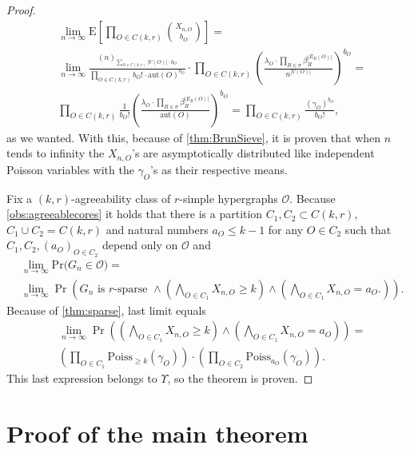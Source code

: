 \documentclass[12pt,notitlepage,a4paper]{article}
\theoremstyle{definition}
\newcommand{\Ln}{\lim\limits_{n\to \infty}}
\newcommand{\PR}[1]{\mathrm{Pr}\big(#1\big)}
\newcommand{\aut}{\mathrm{aut}}
\begin{document}
\begin{proof}
\begin{align*}
&\Ln \mathrm{E}\left[
\prod_{O\in C(k,r)}
\binom{X_{n,O}}{b_O}
\right]=\\
&
\Ln
\frac{(n)_{\sum_{O\in C(k,r)} |V(O)|\cdot b_O}}
{\prod_{O\in C(k,r)} b_O!\cdot \aut(O)^{b_O}} \cdot
\prod_{O\in C(k,r)}
\left( 
\frac{\lambda_O \cdot \prod_{R\in \sigma} \beta_R^{|E_R(O)|}}{n^{|V(O)|}}
\right)^{b_O} = \\
&\prod_{O\in C(k,r)} \frac{1}{b_O!}\left(\frac{\lambda_O  
\cdot \prod_{R\in \sigma} \beta_R^{|E_R(O)|} }{\aut(O)}
\right)^{b_O}= \prod_{O\in C(k,r)} 
\frac{(\gamma_O)^{b_O}}{b_O!},
\end{align*}
as we wanted. With this, because of \cref{thm:BrunSieve}, it 
is proven that when $n$ tends to infinity
the $X_{n,O}$'s are asymptotically distributed 
like independent
Poisson variables with the $\gamma_O$'s as their respective means.\par
Fix a $(k,r)$-agreeability class of $r$-simple hypergraphs
$\mathcal{O}$. 
Because \cref{obs:agreeablecores} it holds that
there is a partition $C_1, C_2\subset C(k,r)$, $C_1\cup C_2=C(k,r)$ 
and natural numbers $a_O\leq k-1$ for any $O\in C_2$ such that
$C_1, C_2, (a_O)_{O\in C_2}$ depend only on $\mathcal{O}$ and
\begin{align*}
 & \Ln
 \PR{G_n \in \mathcal{O}}=\\
 &\Ln
 \Pr \left(
 G_n \text{ is $r$-sparse } \wedge
 \left(
 \bigwedge_{O\in C_1}
 X_{n,O}\geq k
 \right)
 \wedge
 \left(
 \bigwedge_{O\in C_1}
 X_{n,O}=a_O.
 \right)
 \right).
\end{align*}
Because of \cref{thm:sparse}, last limit equals
\begin{align*}
&\Ln
\Pr \left(
\left(
\bigwedge_{O\in C_1}
X_{n,O}\geq k
\right)
\wedge
\left(
\bigwedge_{O\in C_1}
X_{n,O}=a_O
\right)
\right)
=\\
&
\left(
\prod_{O\in C_1}
\mathrm{Poiss}_{\geq k}(\gamma_O)
\right)
\cdot
\left(
\prod_{O\in C_2}
\mathrm{Poiss}_{a_O}(\gamma_O)
\right)
.
\end{align*}
This last expression belongs to $\Upsilon$, so the theorem is proven. 
\end{proof}

\section{Proof of the main theorem} \label{sect:main}
\end{document}
